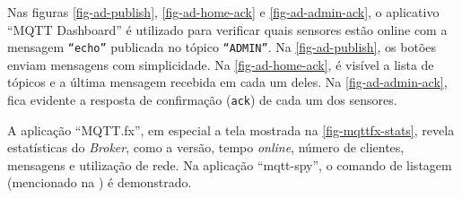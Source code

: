 Nas figuras \ref{fig-ad-publish}, \ref{fig-ad-home-ack} e \ref{fig-ad-admin-ack},
o aplicativo ``MQTT Dashboard'' é utilizado para verificar quais sensores
estão online com a mensagem \texttt{``echo''} publicada no tópico \texttt{``ADMIN''}. Na
\autoref{fig-ad-publish}, os botões enviam mensagens com simplicidade. Na
\autoref{fig-ad-home-ack}, é visível a lista de tópicos e a última mensagem
recebida em cada um deles. Na \autoref{fig-ad-admin-ack}, fica evidente a
resposta de confirmação (\texttt{ack}) de cada um dos sensores.

A aplicação ``MQTT.fx'', em especial a tela mostrada na
\autoref{fig-mqttfx-stats}, revela estatísticas do \emph{Broker}, como a versão,
tempo \emph{online}, número de clientes, mensagens e utilização de rede.
Na aplicação ``mqtt-spy'', o comando de listagem (mencionado na
) é demonstrado.

